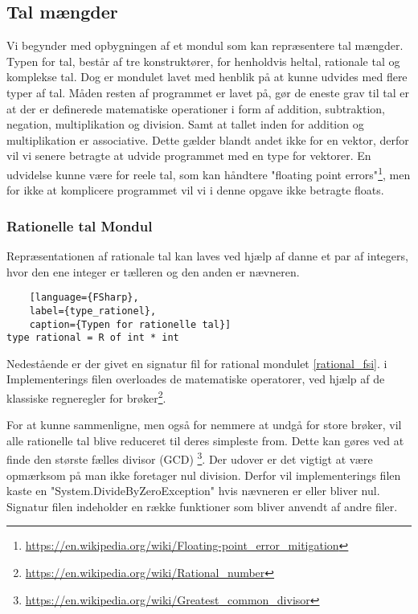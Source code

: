 \documentclass{article}
\begin{document}
\subsection{Tal mængder}
Vi begynder med opbygningen af et mondul som kan repræsentere tal mængder. Typen for tal, består af tre konstruktører, for henholdvis heltal, rationale tal og komplekse tal. Dog er mondulet lavet med henblik på at kunne udvides med flere typer af tal. Måden resten af programmet er lavet på, gør de eneste grav til tal er at der er definerede matematiske operationer i form af addition, subtraktion, negation, multiplikation og division. Samt at tallet inden for addition og multiplikation er associative. Dette gælder blandt andet ikke for en vektor, derfor vil vi senere betragte at udvide programmet med en type for vektorer. En udvidelse kunne være for reele tal, som kan håndtere "floating point errors"\footnote{\url{https://en.wikipedia.org/wiki/Floating-point_error_mitigation}}, men for ikke at komplicere programmet vil vi i denne opgave ikke betragte floats.  

\subsubsection{Rationelle tal Mondul}
Repræsentationen af rationale tal kan laves ved hjælp af danne et par af integers, hvor den ene integer er tælleren og den anden er nævneren. 

\begin{lstlisting}
    [language={FSharp}, 
    label={type_rationel},
    caption={Typen for rationelle tal}]
type rational = R of int * int
\end{lstlisting}

Nedestående er der givet en signatur fil for rational mondulet \ref{rational_fsi}. i Implementerings filen overloades de matematiske operatorer, ved hjælp af de klassiske regneregler for brøker\footnote{\url{https://en.wikipedia.org/wiki/Rational_number}}. 


For at kunne sammenligne, men også for nemmere at undgå for store brøker, vil alle rationelle tal blive reduceret til deres simpleste from. Dette kan gøres ved at finde den største fælles divisor (GCD) \footnote{\url{https://en.wikipedia.org/wiki/Greatest_common_divisor}}. Der udover er det vigtigt at være opmærksom på man ikke foretager nul division. Derfor vil implementerings filen kaste en "System.DivideByZeroException" hvis nævneren er eller bliver nul. Signatur filen indeholder en række funktioner som bliver anvendt af andre filer. 
 
\end{document}
